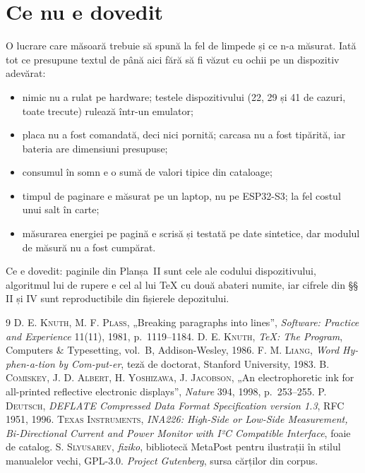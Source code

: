 \documentclass[11pt,a4paper,oneside]{article}
\begin{document}
\section{Ce nu e dovedit}

O lucrare care măsoară trebuie să spună la fel de limpede și ce
n-a măsurat. Iată tot ce presupune textul de până aici fără să fi văzut cu
ochii pe un dispozitiv adevărat:
\begin{itemize}[leftmargin=1.4em]
  \item nimic nu a rulat pe hardware; testele dispozitivului (22, 29 și 41 de
    cazuri, toate trecute) rulează într-un emulator;
  \item placa nu a fost comandată, deci nici pornită; carcasa nu a fost
    tipărită, iar bateria are dimensiuni presupuse;
  \item consumul în somn e o sumă de valori tipice din cataloage;
  \item timpul de paginare e măsurat pe un laptop, nu pe ESP32-S3; la fel
    costul unui salt în carte;
  \item măsurarea energiei pe pagină e scrisă și testată pe date sintetice,
    dar modulul de măsură nu a fost cumpărat.
\end{itemize}
Ce e dovedit: paginile din Planșa~II sunt cele ale codului dispozitivului,
algoritmul lui de rupere e cel al lui TeX cu două abateri numite, iar cifrele
din §§\,II și IV sunt reproductibile din fișierele depozitului.

\renewcommand\refname{\normalfont\large\itshape Bibliografie}
\begin{thebibliography}{9}\small
{} \textsc{D. E. Knuth, M. F. Plass}, „Breaking paragraphs
  into lines”, \textit{Software: Practice and Experience} 11(11), 1981,
  p.~1119–1184.
 \textsc{D. E. Knuth}, \textit{TeX: The Program}, Computers
  \& Typesetting, vol.~B, Addison-Wesley, 1986.
 \textsc{F. M. Liang}, \textit{Word Hy-phen-a-tion by
  Com-put-er}, teză de doctorat, Stanford University, 1983.
 \textsc{B. Comiskey, J. D. Albert, H. Yoshizawa,
  J. Jacobson}, „An electrophoretic ink for all-printed reflective electronic
  displays”, \textit{Nature} 394, 1998, p.~253–255.
 \textsc{P. Deutsch}, \textit{DEFLATE Compressed Data Format
  Specification version 1.3}, RFC 1951, 1996.
 \textsc{Texas Instruments}, \textit{INA226: High-Side or
  Low-Side Measurement, Bi-Directional Current and Power Monitor with
  I²C Compatible Interface}, foaie de catalog.
 \textsc{S. Slyusarev}, \textit{fiziko}, bibliotecă MetaPost
  pentru ilustrații în stilul manualelor vechi, GPL-3.0.
 \textit{Project Gutenberg}, sursa cărților din corpus.
\end{thebibliography}
\end{document}

